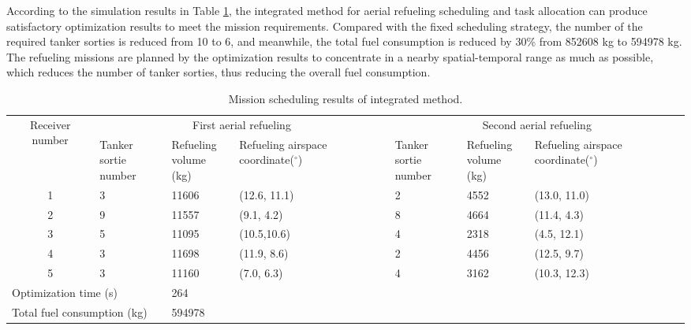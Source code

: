 According to the simulation results in Table \ref{Tab_15.6}, the integrated method for aerial refueling scheduling and task allocation can produce satisfactory optimization results to meet the mission requirements. Compared with the fixed scheduling strategy, the number of the required tanker sorties is reduced from 10 to 6, and meanwhile, the total fuel consumption is reduced by 30\% from 852608 kg to 594978 kg. The refueling missions are planned by the optimization results to concentrate in a nearby spatial-temporal range as much as possible, which reduces the number of tanker sorties, thus reducing the overall fuel consumption.




\begin{table}
	\caption{Mission scheduling results of integrated method.}
	\begin{centering}
		\begin{tabular}{c|l|l|l|l|l|l}
			\hline
			\multirow{2}{*}{Receiver number}& \multicolumn{3}{c|}{First aerial refueling} & \multicolumn{3}{c}{Second aerial refueling} \\\cline{2-7}
			& \tabincell{l}{Tanker sortie\\number}& \tabincell{l}{Refueling\\volume (kg)}&\tabincell{l}{Refueling airspace \\coordinate($^{\circ}$)}&\tabincell{l}{Tanker sortie\\number}&\tabincell{l}{Refueling\\volume (kg)}&\tabincell{l}{Refueling airspace \\coordinate($^{\circ}$)} \\
			\hline
			1 & 3& 11606& (12.6, 11.1)&2&4552&(13.0, 11.0) \\
			2 & 9& 11557& (9.1, 4.2)&8&4664&(11.4, 4.3) \\
			3 & 5& 11095& (10.5,10.6)&4&2318&(4.5, 12.1) \\
			4 & 3& 11698& (11.9, 8.6)&2&4456&(12.5, 9.7) \\
			5 & 3& 11160& (7.0, 6.3)&4&3162&(10.3, 12.3) \\\hline
			\multicolumn{2}{l}{Optimization time (s)}& \multicolumn{5}{l}{264}\\
			\multicolumn{2}{l}{Total fuel consumption (kg)}& \multicolumn{5}{l}{594978}\\
			\hline 
		\end{tabular}
		\par\end{centering}
	\centering{}
	\label{Tab_15.6}
\end{table}




